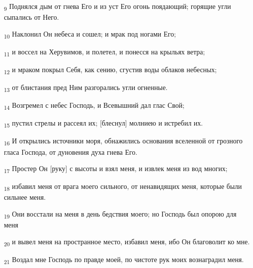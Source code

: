 \begin{tcolorbox}
\textsubscript{9} Поднялся дым от гнева Его и из уст Его огонь поядающий; горящие угли сыпались от Него.
\end{tcolorbox}
\begin{tcolorbox}
\textsubscript{10} Наклонил Он небеса и сошел; и мрак под ногами Его;
\end{tcolorbox}
\begin{tcolorbox}
\textsubscript{11} и воссел на Херувимов, и полетел, и понесся на крыльях ветра;
\end{tcolorbox}
\begin{tcolorbox}
\textsubscript{12} и мраком покрыл Себя, как сению, сгустив воды облаков небесных;
\end{tcolorbox}
\begin{tcolorbox}
\textsubscript{13} от блистания пред Ним разгорались угли огненные.
\end{tcolorbox}
\begin{tcolorbox}
\textsubscript{14} Возгремел с небес Господь, и Всевышний дал глас Свой;
\end{tcolorbox}
\begin{tcolorbox}
\textsubscript{15} пустил стрелы и рассеял их; [блеснул] молниею и истребил их.
\end{tcolorbox}
\begin{tcolorbox}
\textsubscript{16} И открылись источники моря, обнажились основания вселенной от грозного гласа Господа, от дуновения духа гнева Его.
\end{tcolorbox}
\begin{tcolorbox}
\textsubscript{17} Простер Он [руку] с высоты и взял меня, и извлек меня из вод многих;
\end{tcolorbox}
\begin{tcolorbox}
\textsubscript{18} избавил меня от врага моего сильного, от ненавидящих меня, которые были сильнее меня.
\end{tcolorbox}
\begin{tcolorbox}
\textsubscript{19} Они восстали на меня в день бедствия моего; но Господь был опорою для меня
\end{tcolorbox}
\begin{tcolorbox}
\textsubscript{20} и вывел меня на пространное место, избавил меня, ибо Он благоволит ко мне.
\end{tcolorbox}
\begin{tcolorbox}
\textsubscript{21} Воздал мне Господь по правде моей, по чистоте рук моих вознаградил меня.
\end{tcolorbox}
